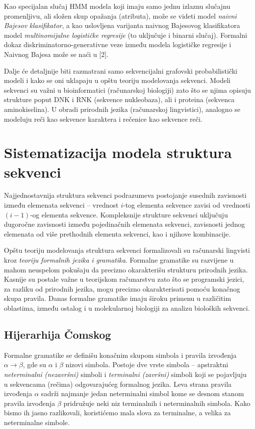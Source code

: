 \documentclass[a4paper, 12pt]{article}
\begin{document}
Kao specijalan slučaj HMM modela koji imaju samo jednu izlaznu slučajnu promenljivu, ali složen skup opažanja (atributa), može se videti model \textit{naivni Bajesov klasifikator}, a kao uslovljena varijanta naivnog Bajesovog klasifikatora model \textit{multinomijalne logističke regresije} (to uključuje i binarni slučaj). Formalni dokaz diskriminatorno-generativne veze između modela logističke regresije i Naivnog Bajesa može se naći u [2].

Dalje će detaljnije biti razmatrani samo sekvencijalni grafovski probabilistički modeli i kako se oni uklapaju u opštu teoriju modelovanja sekvenci. Modeli sekvenci su važni u bioinformatici (računarskoj biologiji) zato što se njima opisuju strukture poput DNK i RNK (sekvence nukleobaza), ali i proteina (sekvenca aminokiselina). U obradi prirodnih jezika (računarskoj lingvistici), analogno se modeluju reči kao sekvence karaktera i rečenice kao sekvence reči.

\section{Sistematizacija modela struktura sekvenci}

Najjednostavnija struktura sekvenci podrazumeva postojanje susednih zavisnosti između elemenata sekvenci -- vrednost $i$-tog elementa sekvence zavisi od vrednosti $(i-1)$-og elementa sekvence. Kompleksnije strukture sekvenci uključuju dugoročne zavisnosti između pojedinačnih elemenata sekvenci, zavisnosti jednog elemenata od više prethodnih elementa sekvenci, kao i njihove kombinacije.

Opštu teoriju modelovanja struktura sekvenci formalizovali su računarski lingvisti kroz \textit{teoriju formalnih jezika i gramatika}.  Formalne gramatike su razvijene u mahom neuspelom pokušaju da precizno okarakterišu strukturu prirodnih jezika. Kasnije su postale važne u teorijskom računarstvu zato što se programski jezici, za razliku od prirodnih jezika, mogu precizno okarakterisati pomoću konačnog skupa pravila. Danas formalne gramatike imaju široku primenu u različitim oblastima, između ostalog i u molekularnoj biologiji za analizu bioloških sekvenci.

\subsection{Hijerarhija Čomskog}

Formalne gramatike se definišu konačnim skupom simbola i pravila izvođenja $\alpha \rightarrow \beta$, gde su $\alpha$ i $\beta$ nizovi simbola. Postoje dve vrste simbola -- apstraktni \textit{neterminalni (nezavršni)} simboli i \textit{terminalni (završni)} simboli koji se pojavljuju u sekvencama (rečima) odgovarajućeg formalnog jezika. Leva strana pravila izvođenja $\alpha$ sadrži najmanje jedan neterminalni simbol kome se desnom stanom pravila izvođenja $\beta$ pridružuje neki niz terminalnih i neterminalnih simbola. Kako bismo ih jasno razlikovali, koristićemo mala slova za terminalne, a velika za neterminalne simbole.
 
\end{document}
